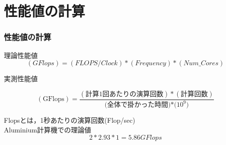 \documentclass[dvipdfmx]{beamer}
\begin{document}
\section{性能値の計算}
\begin{frame}
  \frametitle{性能値の計算}
	\begin{block}{理論性能値}
	\begin{equation*}
		(GFlops) = (FLOPS/Clock) * (Frequency) * (Num\_Cores)
  \end{equation*}
	\end{block}

	\begin{block}{実測性能値}
	\begin{center}
  \begin{equation*}
		(\mbox{GFlops}) = \frac{(\mbox{計算1回あたりの演算回数})*(\mbox{計算回数})}{(\mbox{全体で掛かった時間)*($10^9$)}}
  \end{equation*}
	\end{center}
	\end{block}
	Flopsとは，1秒あたりの演算回数(Flop/sec)\\
	Aluminium計算機での理論値
	\begin{equation*}
		2 * 2.93 * 1 = 5.86GFlops
  \end{equation*}
\end{frame}



\end{document}
